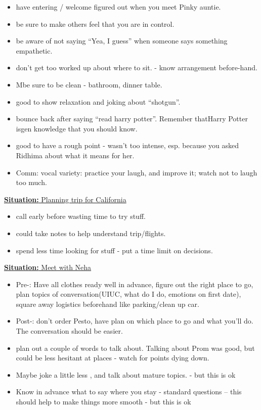 \documentclass[11pt]{article}
\newcommand{\newSituation}[1]{\underline{\textbf{Situation:} #1} }
\begin{document}
\begin{itemize} 
\item have entering / welcome figured out when you meet Pinky auntie.
\item be sure to make others feel that you are in control.

\item  be aware of not saying ``Yea, I guess'' when someone says something empathetic.
\item don't get too worked up about where to sit. - know arrangement
  before-hand. 


\item Mbe sure to be clean - bathroom, dinner table. 
\item good to show relaxation and joking about ``shotgun''.


\item bounce back after saying ``read harry potter''. Remember
  thatHarry Potter isgen knowledge that you should know. 
\item good to have a rough point - wasn't too intense, esp. because you asked Ridhima about what it means for her.
\item Comm: vocal variety: practice your laugh, and improve it; watch not to laugh too much.
\end{itemize} 


\newSituation{Planning trip for California} 

\begin{itemize} 
\item call early before wasting time to try stuff. 
\item could take notes to help understand trip/flights. 
\item spend less time looking for stuff - put a time limit on decisions. 

\end{itemize} 

 \newSituation{Meet with Neha }

\begin{itemize}
\item Pre-: Have all clothes ready well in
      advance, figure out the right place to go, plan topics of
      conversation(UIUC, what do I do, emotions on first date), square
      away logistics beforehand like parking/clean up car.  

\item Post-:  don't order Pesto, have plan on which place to go and what you'll do. The conversation should be easier.
\item plan out a couple of words to talk about. Talking about Prom was good, but could be less hesitant at places - watch for points dying down. 

\item Maybe joke a little less , and talk about mature topics. - but this is ok

\item Know in advance what to say where you stay - standard questions -- this should help to make things more smooth - but this is ok

\end{itemize} 
\end{document}
